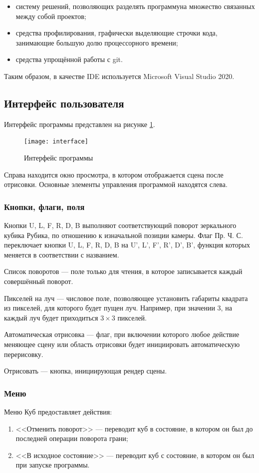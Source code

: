 \begin{itemize}
	\item систему решений, позволяющих разделять программуна множество связанных между собой проектов;
	\item средства профилирования, графически выделяющие строчки кода, занимающие большую долю процессорного времени;
	\item средства упрощённой работы с git.
\end{itemize}

Таким образом, в качестве IDE используется Microsoft Visual Studio 2020.

\subsection{Интерфейс пользователя}
Интерфейс программы представлен на рисунке \ref{fig:interface}.

\begin{figure}[ht]
	\centering
	\texttt{[image: interface]}
	\caption{Интерфейс программы}
	\label{fig:interface}
\end{figure}

Справа находится окно просмотра, в котором отображается сцена после отрисовки. Основные элементы управления программой находятся слева.

\subsubsection{Кнопки, флаги, поля}
Кнопки U, L, F, R, D, B выполняют соответствующий поворот зеркального кубика Рубика, по отношению к изначальной позиции камеры. Флаг Пр. Ч. С. переключает кнопки U, L, F, R, D, B на U', L', F', R', D', B', функция которых меняется в соответствии с названием.

Список поворотов --- поле только для чтения, в которое записывается каждый совершённый поворот.

Пикселей на луч --- числовое поле, позволяющее установить габариты квадрата из пикселей, для которого будет пущен луч. Например, при значении 3, на каждый луч будет приходиться $3\times 3$ пикселей.

Автоматическая отрисовка --- флаг, при включении которого любое действие меняющее сцену или область отрисовки будет инициировать автоматическую перерисовку.

Отрисовать --- кнопка, инициирующая рендер сцены.

\subsubsection{Меню}
Меню Куб предоставляет действия:
\begin{enumerate}
	\item <<Отменить поворот>> --- переводит куб в состояние, в котором он был до последней операции поворота грани;
	\item <<В исходное состояние>> --- переводит куб с состояние, в котором он был при запуске программы.
\end{enumerate}

